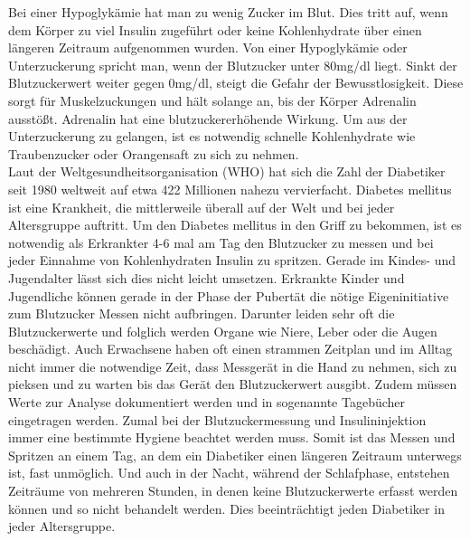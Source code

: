 \documentclass[a4paper, 12pt]{scrartcl}
\begin{document}
			Bei einer Hypoglykämie hat man zu wenig Zucker im Blut. Dies tritt auf, wenn dem Körper zu viel Insulin zugeführt oder keine Kohlenhydrate über einen längeren Zeitraum aufgenommen wurden. Von einer Hypoglykämie oder Unterzuckerung spricht man, wenn der Blutzucker unter 80mg/dl liegt. Sinkt der Blutzuckerwert weiter gegen 0mg/dl, steigt die Gefahr der Bewusstlosigkeit. Diese sorgt für Muskelzuckungen und hält solange an, bis der Körper Adrenalin ausstößt. Adrenalin hat eine blutzuckererhöhende Wirkung. Um aus der Unterzuckerung zu gelangen, ist es notwendig schnelle Kohlenhydrate wie Traubenzucker oder Orangensaft zu sich zu nehmen.\\
			
			
			Laut der Weltgesundheitsorganisation (WHO) hat sich die Zahl der Diabetiker seit 1980 weltweit auf etwa 422 Millionen nahezu vervierfacht. Diabetes mellitus ist eine Krankheit, die mittlerweile überall auf der Welt und bei jeder Altersgruppe auftritt. 
			Um den Diabetes mellitus in den Griff zu bekommen, ist es notwendig als Erkrankter 4-6 mal am Tag den Blutzucker zu messen und bei jeder Einnahme von Kohlenhydraten Insulin zu spritzen. Gerade im Kindes- und Jugendalter lässt sich dies nicht leicht umsetzen. Erkrankte Kinder und Jugendliche können gerade in der Phase der Pubertät die nötige Eigeninitiative zum Blutzucker Messen nicht aufbringen. Darunter leiden sehr oft die Blutzuckerwerte und folglich werden Organe wie Niere, Leber oder die Augen beschädigt.
			Auch Erwachsene haben oft einen strammen Zeitplan und im Alltag nicht immer die notwendige Zeit, dass Messgerät in die Hand zu nehmen, sich zu pieksen und zu warten bis das Gerät den Blutzuckerwert ausgibt. Zudem müssen Werte zur Analyse dokumentiert werden und in sogenannte Tagebücher eingetragen werden. Zumal bei der Blutzuckermessung und Insulininjektion immer eine bestimmte Hygiene beachtet werden muss. Somit ist das Messen und Spritzen an einem Tag, an dem ein Diabetiker einen längeren Zeitraum unterwegs ist, fast unmöglich. Und auch in der Nacht, während der Schlafphase, entstehen Zeiträume von mehreren Stunden, in denen keine Blutzuckerwerte erfasst werden können und so nicht behandelt werden. Dies beeinträchtigt jeden Diabetiker in jeder Altersgruppe.
\end{document}
